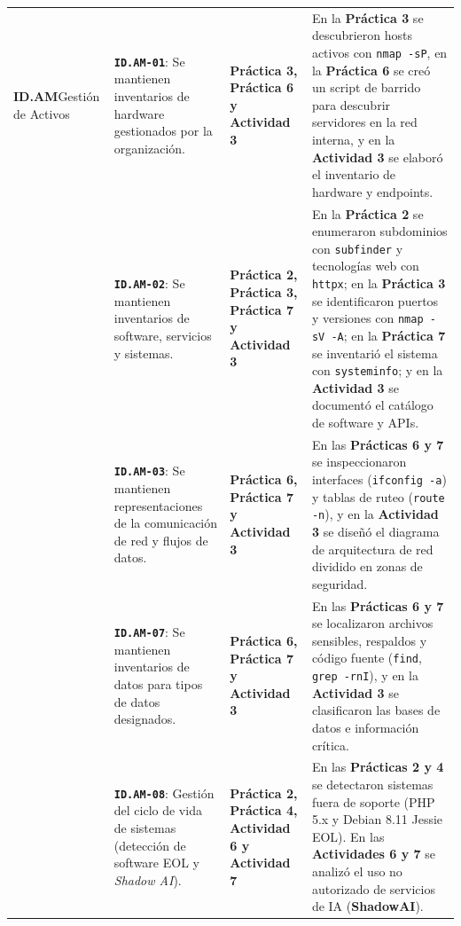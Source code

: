 \documentclass[letterpaper,11pt]{article}
\begin{document}
\begin{longtable}{|L{2.8cm}|L{4.5cm}|L{2.9cm}|L{6.5cm}|}
\textbf{ID.AM}\newline Gestión de Activos &
\textbf{\texttt{ID.AM-01}}: Se mantienen inventarios de hardware gestionados por la organización. &
\textbf{Práctica 3, Práctica 6 y Actividad 3} &
En la \textbf{Práctica 3} se descubrieron hosts activos con \texttt{nmap -sP}, en la \textbf{Práctica 6} se creó un script de barrido para descubrir servidores en la red interna, y en la \textbf{Actividad 3} se elaboró el inventario de hardware y endpoints. \\
\nopagebreak
 &
\textbf{\texttt{ID.AM-02}}: Se mantienen inventarios de software, servicios y sistemas. &
\textbf{Práctica 2, Práctica 3, Práctica 7 y Actividad 3} &
En la \textbf{Práctica 2} se enumeraron subdominios con \texttt{subfinder} y tecnologías web con \texttt{httpx}; en la \textbf{Práctica 3} se identificaron puertos y versiones con \texttt{nmap -sV -A}; en la \textbf{Práctica 7} se inventarió el sistema con \texttt{systeminfo}; y en la \textbf{Actividad 3} se documentó el catálogo de software y APIs. \\
\nopagebreak
 &
\textbf{\texttt{ID.AM-03}}: Se mantienen representaciones de la comunicación de red y flujos de datos. &
\textbf{Práctica 6, Práctica 7 y Actividad 3} &
En las \textbf{Prácticas 6 y 7} se inspeccionaron interfaces (\texttt{ifconfig -a}) y tablas de ruteo (\texttt{route -n}), y en la \textbf{Actividad 3} se diseñó el diagrama de arquitectura de red dividido en zonas de seguridad. \\
\nopagebreak
 &
\textbf{\texttt{ID.AM-07}}: Se mantienen inventarios de datos para tipos de datos designados. &
\textbf{Práctica 6, Práctica 7 y Actividad 3} &
En las \textbf{Prácticas 6 y 7} se localizaron archivos sensibles, respaldos y código fuente (\texttt{find}, \texttt{grep -rnI}), y en la \textbf{Actividad 3} se clasificaron las bases de datos e información crítica. \\
\nopagebreak
 &
\textbf{\texttt{ID.AM-08}}: Gestión del ciclo de vida de sistemas (detección de software EOL y \textit{Shadow AI}). &
\textbf{Práctica 2, Práctica 4, Actividad 6 y Actividad 7} &
En las \textbf{Prácticas 2 y 4} se detectaron sistemas fuera de soporte (PHP 5.x y Debian 8.11 Jessie EOL). En las \textbf{Actividades 6 y 7} se analizó el uso no autorizado de servicios de IA (\textbf{ShadowAI}). \\
\hline


\end{longtable}
\end{document}
